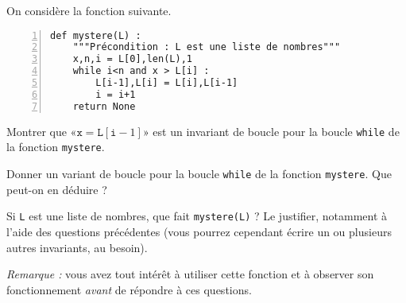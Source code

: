 On considère la fonction suivante.
\begin{Verbatim}[gobble=0,numbers=left]
def mystere(L) :
    """Précondition : L est une liste de nombres"""
    x,n,i = L[0],len(L),1
    while i<n and x > L[i] :
        L[i-1],L[i] = L[i],L[i-1]
        i = i+1
    return None
\end{Verbatim}

\question{}Montrer que «$\texttt x = \texttt L[\texttt i-1]$» est un invariant de boucle pour la boucle \texttt{while} de la fonction \texttt{mystere}.

\question{}Donner un variant de boucle pour la boucle \texttt{while} de la fonction \texttt{mystere}. Que peut-on en déduire ? 

\question{}Si \texttt{L} est une liste de nombres, que fait \texttt{mystere(L)} ? Le justifier, notamment à l'aide des questions précédentes (vous pourrez cependant écrire un ou plusieurs autres invariants, au besoin).

\bigskip{}

\emph{Remarque :} vous avez tout intérêt à utiliser cette fonction et à observer son fonctionnement \emph{avant} de répondre à ces questions. 



